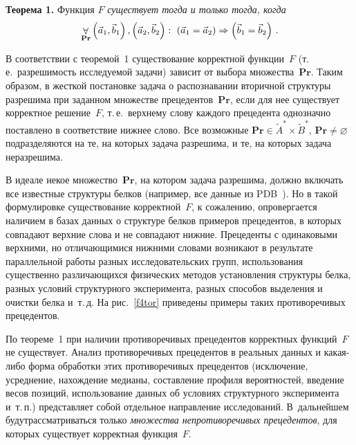 \begin{multicols}{2}
\medskip

\noindent
\textbf{Теорема 1.} Функция $F$ \textit{существует тогда и только тогда, когда} 
\begin{equation}
\mathop{\forall}\limits_{\mathbf{Pr}}\left (\vec{a}_1,\vec{b}_1\right), 
\left(\vec{a}_2,\vec{b}_2\right):\ \left (\vec{a}_1=\vec{a}_2\right) \Rightarrow 
\left(\vec{b}_1=\vec{b}_2\right)\,.
\label{1tor}
\end{equation}

\medskip

    В соответствии с теоремой~1 существование корректной функции~$F$ 
(т.\,е.\ разрешимость ис\-сле\-ду\-емой задачи) зависит от выбора 
множества~$\mathbf{Pr}$.  Таким образом, в жесткой постановке задача о 
распознавании вторичной структуры разрешима при заданном множестве 
прецедентов~$\mathbf{Pr}$, если для нее существует корректное решение~$F$, 
т.\,е.\ верхнему слову каждого прецедента однозначно поставлено в 
соответствие нижнее слово. Все возможные $\mathbf{Pr}\in \tilde{A}^*\times 
\tilde{B}^*$, $\mathbf{Pr}\not=\varnothing$ подразделяются на те, на которых 
задача разрешима, и те, на которых задача не\-раз\-ре\-шима.

    В идеале некое множество~$\mathbf{Pr}$, на котором задача разрешима, 
должно включать все известные структуры белков (например, все данные из 
PDB~\cite{2tor}). Но в такой формулировке существование корректной~$F$, к 
сожалению, опровергается наличием в базах данных о структуре белков 
примеров прецедентов, в которых совпадают верхние слова и не совпадают 
нижние. Прецеденты с одинаковыми верхними, но отличающимися нижними 
словами возникают в результате параллельной работы разных 
исследовательских групп, использования существенно различающихся 
физических методов установления структуры белка, разных условий 
структурного эксперимента, разных способов выделения и очистки белка 
и~т.\,д. На рис.~\ref{f4tor} приведены примеры таких противоречивых 
пре\-це\-дентов. 


    По теореме~1 при наличии противоречивых прецедентов корректных 
функций~$F$ не существует. Анализ противоречивых прецедентов в реальных 
данных и ка\-кая-ли\-бо форма обработки этих противоречивых прецедентов 
(исключение, усреднение, нахождение медианы, составление профиля\linebreak 
вероятностей, введение весов позиций, использование данных об условиях 
структурного эксперимента и~т.\,п.) представляет собой отдельное направление 
исследований. В~дальнейшем будут\linebreak рассматриваться только \textit{множества 
непротиворечивых прецедентов}, для которых существует корректная 
функ\-ция~$F$. 


\end{multicols}
